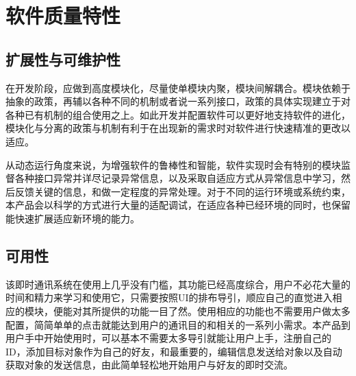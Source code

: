 \chapter{软件质量特性}





\section{扩展性与可维护性}
在开发阶段，应做到高度模块化，尽量使单模块内聚，模块间解耦合。模块依赖于抽象的政策，再辅以各种不同的机制或者说一系列接口，政策的具体实现建立于对各种已有机制的组合使用之上。如此开发并配置软件可以更好地支持软件的进化，模块化与分离的政策与机制有利于在出现新的需求时对软件进行快速精准的更改以适应。

从动态运行角度来说，为增强软件的鲁棒性和智能，软件实现时会有特别的模块监督各种接口异常并详尽记录异常信息，以及采取自适应方式从异常信息中学习，然后反馈关键的信息，和做一定程度的异常处理。对于不同的运行环境或系统约束，本产品会以科学的方式进行大量的适配调试，在适应各种已经环境的同时，也保留能快速扩展适应新环境的能力。

\section{可用性}
该即时通讯系统在使用上几乎没有门槛，其功能已经高度综合，用户不必花大量的时间和精力来学习和使用它，只需要按照UI的排布导引，顺应自己的直觉进入相应的模块，便能对其所提供的功能一目了然。使用相应的功能也不需要用户做太多配置，简简单单的点击就能达到用户的通讯目的和相关的一系列小需求。本产品到用户手中开始使用时，可以基本不需要太多导引就能让用户上手，注册自己的ID，添加目标对象作为自己的好友，和最重要的，编辑信息发送给对象以及自动获取对象的发送信息，由此简单轻松地开始用户与好友的即时交流。

